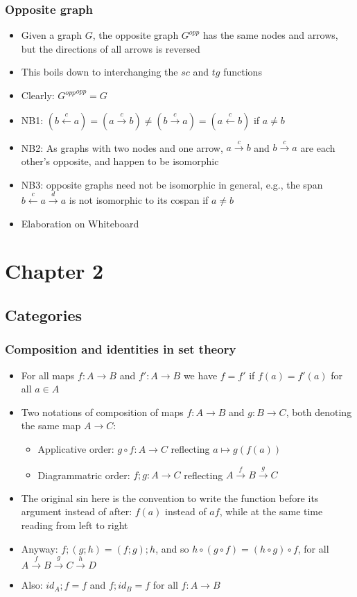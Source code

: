 \documentclass[handout]{beamer}
\begin{document}
\frame
  {   
    \frametitle{Opposite graph}\label{Ch2:oppgraph}

 \begin{itemize}[<+->]
\item Given a graph $G$, the opposite graph $G^{opp}$ has the same nodes
and arrows, but the directions of all arrows is reversed
\item This boils down to interchanging the $sc$ and $tg$ functions
\item Clearly: ${G^{opp}}^{opp} = G$
\item NB1: $(b \stackrel{c}{\leftarrow} a) = (a \stackrel{c}{\to} b) \neq  
(b \stackrel{c}{\to} a) = (a \stackrel{c}{\leftarrow} b) $
if $a\neq b$
\item NB2: As graphs with two nodes and one arrow, ${a \stackrel{c}{\to} b}$
and ${b \stackrel{c}{\to} a}$ are each other's opposite, and happen to be isomorphic
\item NB3: opposite graphs need not be isomorphic in general, e.g., the span
${b \stackrel{c}{\leftarrow} a}\stackrel{d}{\to}a$ is not isomorphic to its cospan if $a\neq b$
\item Elaboration on Whiteboard
 \end{itemize}

 }

\section{Chapter 2}
\subsection{Categories}


\frame
  {   
    \frametitle{Composition and identities in set theory}\label{Ch2:comp-id}

 \begin{itemize}[<+->]
\item For all maps $f:A\to B$ and $f':A\to B$ we have $f=f'$ if $f(a)=f'(a)$ for all $a\in A$
\item Two notations of composition of maps $f:A\to B$ and $g: B\to C$,
both denoting the same map $A\to C$:
   \begin{itemize}[<+->]
\item Applicative order: ${g\circ f} : {A\to C}$ reflecting $a\mapsto g(f(a))$
\item Diagrammatric order: ${f;g} : A\to C$ reflecting $A\stackrel{f}{\to}B\stackrel{g}{\to}C$
   \end{itemize}
\item The original sin here is the convention to write the function before its argument
instead of after: $f(a)$ instead of $af$,
while at the same time reading from left to right
\item Anyway: $f;(g;h) = (f;g);h$, and so $h\circ(g\circ f) = (h\circ g)\circ f$,
for all $A\stackrel{f}{\to}B\stackrel{g}{\to}C\stackrel{h}{\to}D$
\item Also: $id_A ; f = f$ and $f; id_B = f$ for all $f:A\to B$
 \end{itemize}

 }
\end{document}
